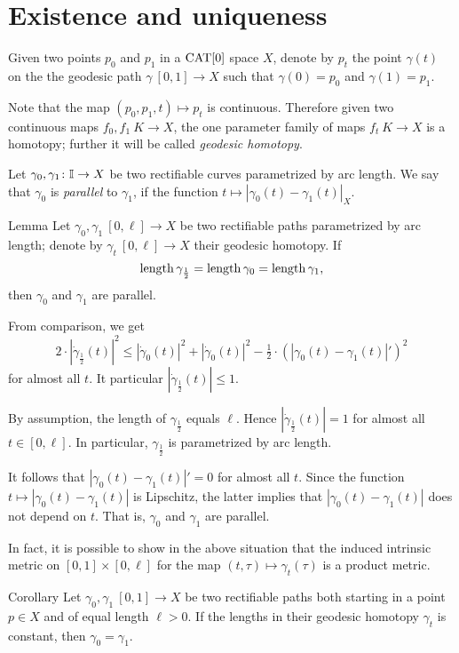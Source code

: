 \documentclass{article}
\begin{document}
\section{Existence and uniqueness}

Given two points $p_0$ and $p_1$ in a $\mathop{\rm CAT}\nolimits[0]$ space $X$,
denote by $p_t$ the point $\gamma(t)$ on the 
the geodesic path $\gamma\:[0,1]\to X$ such that $\gamma(0)=p_0$ and $\gamma(1)=p_1$.

Note that the map $(p_0,p_1,t)\mapsto p_t$ is continuous.
Therefore given two continuous maps $f_0,f_1\:K\to X$,
the one parameter family of maps $f_t\:K\to X$ is a homotopy;
further it will be called \emph{geodesic homotopy}.

Let $\gamma_{0}, \gamma_1\colon\mathbb{I}\to X$ be two rectifiable curves parametrized by arc length. 
We say that  $\gamma_{0}$ is {\em parallel} to $\gamma_{1}$, if the function $t\mapsto |\gamma_{0}(t)-\gamma_{1}(t)|_X$.


\begin{thm}{Lemma}\label{lem:parpaths}
Let $\gamma_0,\gamma_1\:[0,\ell]\to X$ be two rectifiable paths parametrized by arc length;
denote by $\gamma_t\:[0,\ell]\to X$ their geodesic homotopy. 
If 
\[\mathop{\rm length}\nolimits\gamma_{\frac12}
=\mathop{\rm length}\nolimits\gamma_0
=\mathop{\rm length}\nolimits\gamma_1,\] 
then $\gamma_{0}$ and $\gamma_{1}$ are parallel. 
\end{thm}

From comparison, we get
\[2\cdot|\dot\gamma_{\frac12}(t)|^2
\le
|\dot\gamma_{0}(t)|^2
+|\dot\gamma_{0}(t)|^2
-\tfrac12\cdot(|\gamma_{0}(t)-\gamma_{1}(t)|')^2\] 
for almost all $t$.
It particular $|\dot\gamma_{\frac12}(t)|\le 1$.

By assumption, the length of $\gamma_{\frac12}$ equals $\ell$. 
Hence $|\dot\gamma_{\frac12}(t)|=1$ for almost all $t\in[0,\ell]$. 
In particular, $\gamma_{\frac12}$
is parametrized by arc length. 

It follows that $|\gamma_{0}(t)-\gamma_{1}(t)|'=0$ for almost all $t$.
Since the function $t\mapsto |\gamma_{0}(t)-\gamma_{1}(t)|$ is Lipschitz,
the latter  implies that $|\gamma_{0}(t)-\gamma_{1}(t)|$ does not depend on $t$.
That is, $\gamma_{0}$ and $\gamma_{1}$ are parallel.
\qeds

In fact, it is possible to show in the above situation that the induced intrinsic metric on $[0,1]\times[0,\ell]$
for the map $(t,\tau)\mapsto \gamma_t(\tau)$ is a product metric.

\begin{thm}{Corollary}\label{cor:parpaths}
Let $\gamma_0,\gamma_1\:[0,1]\to X$ be two rectifiable paths both starting in a point $p\in X$ and of equal length $\ell>0$. 
If the lengths in their geodesic homotopy $\gamma_t$ is constant, then $\gamma_{0}=\gamma_{1}$.
\end{thm}
\end{document}
